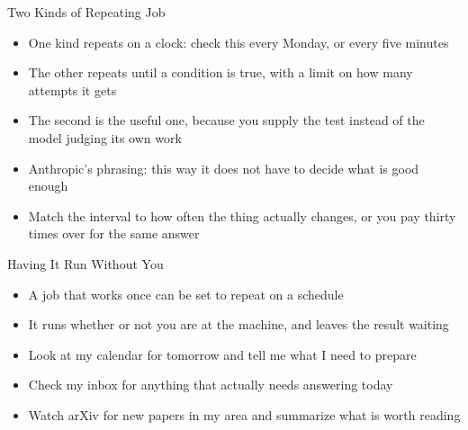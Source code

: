 \documentclass[aspectratio=169]{beamer}
\begin{document}
\begin{frame}{Two Kinds of Repeating Job}
    \begin{itemize}\setlength{\itemsep}{6pt}
        \item One kind repeats on a clock: check this every Monday, or every five minutes
        \item The other repeats until a condition is true, with a limit on how many attempts
              it gets
        \item The second is the useful one, because you supply the test instead of the model
              judging its own work
        \item Anthropic's phrasing: this way it does not have to decide what is good enough
        \item Match the interval to how often the thing actually changes, or you pay thirty
              times over for the same answer
    \end{itemize}
\end{frame}

\begin{frame}{Having It Run Without You}
    \begin{itemize}
        \item A job that works once can be set to repeat on a schedule
        \item It runs whether or not you are at the machine, and leaves the result waiting
        \item Look at my calendar for tomorrow and tell me what I need to prepare
        \item Check my inbox for anything that actually needs answering today
        \item Watch arXiv for new papers in my area and summarize what is worth reading
    \end{itemize}
\end{frame}
\end{document}
